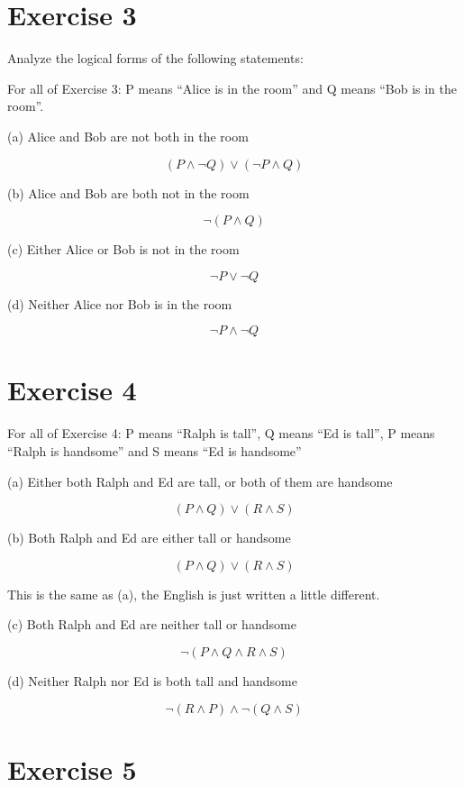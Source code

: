 \documentclass[11pt]{article}
\begin{document}
\section*{Exercise 3}

Analyze the logical forms of the following statements:

For all of Exercise 3: P means ``Alice is in the room'' and Q means ``Bob is in the room''.

\noindent (a) Alice and Bob are not both in the room

$$ (P \wedge \neg Q) \vee (\neg P \wedge Q) $$

\noindent (b) Alice and Bob are both not in the room

$$ \neg (P \wedge Q) $$

\noindent (c) Either Alice or Bob is not in the room

$$ \neg P \vee \neg Q $$

\noindent (d) Neither Alice nor Bob is in the room

$$ \neg P \wedge \neg Q $$

\section*{Exercise 4}

For all of Exercise 4: P means ``Ralph is tall'', Q means ``Ed is tall'', P means ``Ralph is handsome'' and S means ``Ed is handsome''

\noindent (a) Either both Ralph and Ed are tall, or both of them are handsome

$$ (P \wedge Q) \vee (R \wedge S) $$

\noindent (b) Both Ralph and Ed are either tall or handsome

$$ (P \wedge Q) \vee (R \wedge S) $$

This is the same as (a), the English is just written a little different.

\noindent (c) Both Ralph and Ed are neither tall or handsome

$$ \neg (P \wedge Q \wedge R \wedge S) $$

\noindent (d) Neither Ralph nor Ed is both tall and handsome

$$ \neg (R \wedge P) \wedge \neg (Q \wedge S) $$

\section*{Exercise 5}
\end{document}
